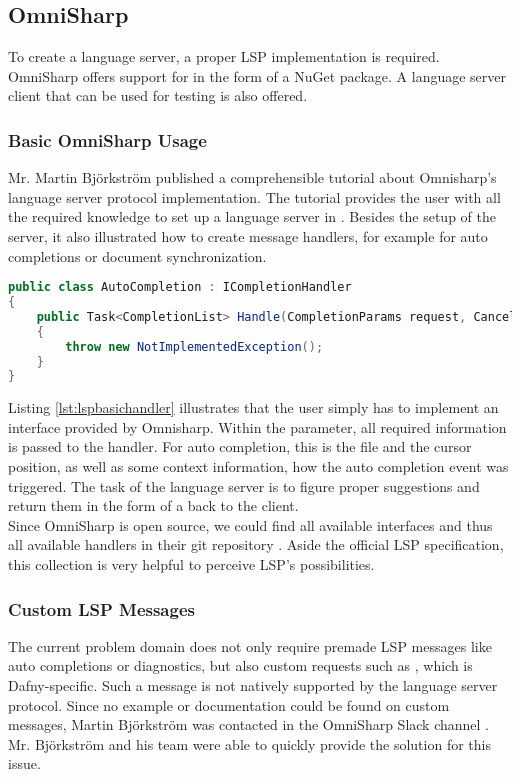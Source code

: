 \subsection{OmniSharp}
\label{section:analysis:omnisharp}
To create a language server, a proper LSP implementation is required.
OmniSharp offers support for \CsharpWithSpace \cite{langserverdotorg} in the form of a NuGet package.
A language server client that can be used for testing is also offered.

\subsubsection{Basic OmniSharp Usage}
Mr. Martin Bj\"orkstr\"om published a comprehensible tutorial about Omnisharp's language server protocol implementation.
The tutorial provides the user with all the required knowledge to set up a language server in \Csharp.
Besides the setup of the server, it also illustrated how to create message handlers, for example for auto completions or document synchronization.\\

\begin{lstlisting}[language=csharp, caption={LSP Handler Implementation}, captionpos=b, label={lst:lspbasichandler}]
public class AutoCompletion : ICompletionHandler
{
    public Task<CompletionList> Handle(CompletionParams request, CancellationToken cancellationToken)
    {
        throw new NotImplementedException();
    }
}
\end{lstlisting}

Listing \ref{lst:lspbasichandler} illustrates that the user simply has to implement an interface provided by Omnisharp.
Within the  parameter, all required information is passed to the handler.
For auto completion, this is the file and the cursor position, as well as some context information, how the auto completion event was triggered.
The task of the language server is to figure proper suggestions and return them in the form of a  back to the client.\\

Since OmniSharp is open source, we could find all available interfaces and thus all available handlers in their git repository \cite{omnisharpgit}.
Aside the official LSP specification, this collection is very helpful to perceive LSP's possibilities.

\subsubsection{Custom LSP Messages}
\label{chapter:customlspmsg}
The current problem domain does not only require premade LSP messages like auto completions or diagnostics, but also custom requests such as , which is Dafny-specific.
Such a message is not natively supported by the language server protocol.
Since no example or documentation could be found on custom messages, Martin Bj\"orkstr\"om was contacted in the OmniSharp Slack channel \cite{omnisharpslack}.
Mr. Bj\"orkstr\"om and his team were able to quickly provide the solution for this issue.\\

